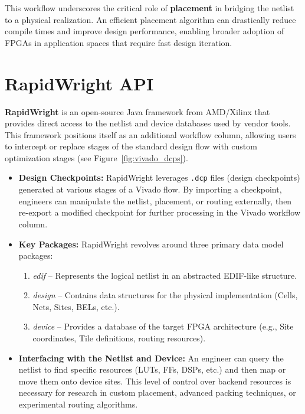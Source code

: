 \documentclass[twocolumn]{article}
\begin{document}
    This workflow underscores the critical role of \textbf{placement} in bridging the netlist to a physical realization. 
    An efficient placement algorithm can drastically reduce compile times and improve design performance, enabling broader adoption of FPGAs in application spaces that require fast design iteration.



\section{RapidWright API}
    \label{sec:rapidwright_api}

    \textbf{RapidWright} is an open-source Java framework from AMD/Xilinx that provides direct access to the netlist and device databases used by vendor tools. 
    This framework positions itself as an additional workflow column, allowing users to intercept or replace stages of the standard design flow with custom optimization stages (see Figure~\ref{fig:vivado_dcps}).

    \begin{itemize}
    \item \textbf{Design Checkpoints:} 
        RapidWright leverages \texttt{.dcp} files (design checkpoints) generated at various stages of a Vivado flow. 
        By importing a checkpoint, engineers can manipulate the netlist, placement, or routing externally, then re-export a modified checkpoint for further processing in the Vivado workflow column.

    \item \textbf{Key Packages:} 
        RapidWright revolves around three primary data model packages:
        \begin{enumerate}
        \item \emph{edif} -- Represents the logical netlist in an abstracted EDIF-like structure.
        \item \emph{design} -- Contains data structures for the physical implementation (Cells, Nets, Sites, BELs, etc.).
        \item \emph{device} -- Provides a database of the target FPGA architecture (e.g., Site coordinates, Tile definitions, routing resources).
        \end{enumerate}

    \item \textbf{Interfacing with the Netlist and Device:} 
        An engineer can query the netlist to find specific resources (LUTs, FFs, DSPs, etc.) and then map or move them onto device sites. 
        This level of control over backend resources is necessary for research in custom placement, advanced packing techniques, or experimental routing algorithms.
    \end{itemize}
\end{document}
